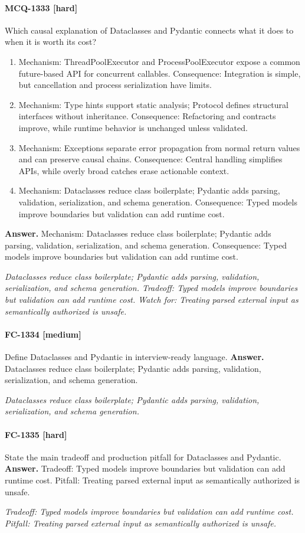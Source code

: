 \paragraph{MCQ-1333 [hard]} Which causal explanation of Dataclasses and Pydantic connects what it does to when it is worth its cost?
\begin{enumerate}[label=\Alph*.]
\item Mechanism: ThreadPoolExecutor and ProcessPoolExecutor expose a common future-based API for concurrent callables. Consequence: Integration is simple, but cancellation and process serialization have limits.
\item Mechanism: Type hints support static analysis; Protocol defines structural interfaces without inheritance. Consequence: Refactoring and contracts improve, while runtime behavior is unchanged unless validated.
\item Mechanism: Exceptions separate error propagation from normal return values and can preserve causal chains. Consequence: Central handling simplifies APIs, while overly broad catches erase actionable context.
\item Mechanism: Dataclasses reduce class boilerplate; Pydantic adds parsing, validation, serialization, and schema generation. Consequence: Typed models improve boundaries but validation can add runtime cost.
\end{enumerate}
\noindent\textbf{Answer.} Mechanism: Dataclasses reduce class boilerplate; Pydantic adds parsing, validation, serialization, and schema generation. Consequence: Typed models improve boundaries but validation can add runtime cost.
\par\textit{Dataclasses reduce class boilerplate; Pydantic adds parsing, validation, serialization, and schema generation. Tradeoff: Typed models improve boundaries but validation can add runtime cost. Watch for: Treating parsed external input as semantically authorized is unsafe.}
\paragraph{FC-1334 [medium]} Define Dataclasses and Pydantic in interview-ready language.
\noindent\textbf{Answer.} Dataclasses reduce class boilerplate; Pydantic adds parsing, validation, serialization, and schema generation.
\par\textit{Dataclasses reduce class boilerplate; Pydantic adds parsing, validation, serialization, and schema generation.}
\paragraph{FC-1335 [hard]} State the main tradeoff and production pitfall for Dataclasses and Pydantic.
\noindent\textbf{Answer.} Tradeoff: Typed models improve boundaries but validation can add runtime cost. Pitfall: Treating parsed external input as semantically authorized is unsafe.
\par\textit{Tradeoff: Typed models improve boundaries but validation can add runtime cost. Pitfall: Treating parsed external input as semantically authorized is unsafe.}
